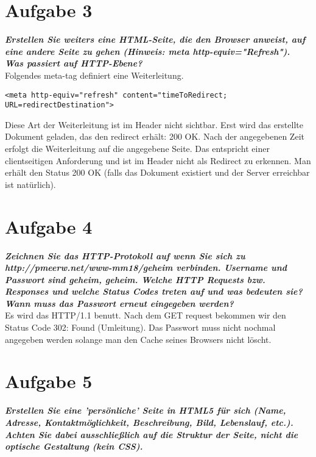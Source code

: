 \documentclass[12pt, a4paper]{report}
\begin{document}
\section*{Aufgabe 3}
\textbf{\textit{Erstellen Sie weiters eine HTML-Seite, die den Browser anweist, auf eine andere Seite zu gehen (Hinweis: meta http-equiv="Refresh"). Was passiert auf HTTP-Ebene?}}\\
Folgendes meta-tag definiert eine Weiterleitung.
\begin{verbatim}
<meta http-equiv="refresh" content="timeToRedirect; URL=redirectDestination">
\end{verbatim}
Diese Art der Weiterleitung ist im Header nicht sichtbar. Erst wird das erstellte Dokument geladen, das den redirect erhält: 200 OK. Nach der angegebenen Zeit
erfolgt die Weiterleitung auf die angegebene Seite. Das entspricht einer clientseitigen Anforderung und ist im Header nicht als Redirect zu erkennen. Man erhält
den Status 200 OK (falls das Dokument existiert und der Server erreichbar ist natürlich).


\section*{Aufgabe 4}
\textbf{\textit{Zeichnen Sie das HTTP-Protokoll auf wenn Sie sich zu http://pmeerw.net/www-mm18/geheim verbinden. Username und Passwort sind geheim, geheim. Welche HTTP Requests bzw. Responses und welche Status Codes treten auf und was bedeuten sie? Wann muss das Passwort erneut eingegeben werden?}}\\
Es wird das HTTP/1.1 benutt. Nach dem GET request bekommen wir den Status Code 302: Found (Umleitung). Das Passwort muss nicht nochmal angegeben werden solange man den Cache seines Browsers nicht löscht.

\section*{Aufgabe 5}
\textbf{\textit{Erstellen Sie eine ’persönliche’ Seite in HTML5 für sich (Name, Adresse, Kontaktmöglichkeit, Beschreibung, Bild, Lebenslauf, etc.). Achten Sie dabei ausschließlich auf die Struktur der Seite, nicht die optische Gestaltung (kein CSS).}}
\end{document}

